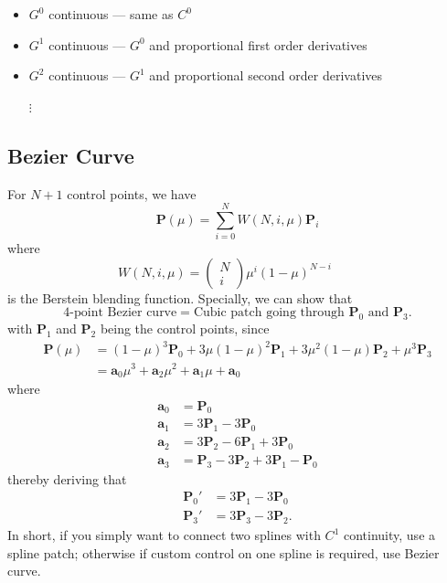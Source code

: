 \documentclass[twocolumn,landscape,10pt]{article}
\theoremstyle{definition}
\begin{document}
\begin{itemize}
    \item $G^0$ continuous --- same as $C^0$
    \item $G^1$ continuous --- $G^0$ and proportional first order derivatives
    \item $G^2$ continuous --- $G^1$ and proportional second order derivatives
    \item[$\vdots$]
\end{itemize} 

\subsection{Bezier Curve}

For $N+1$ control points, we have
\[
    \mathbf{P}(\mu)=\sum_{i=0}^{N} W(N,i,\mu)\mathbf{P}_i
\]
where
\[
    W(N,i,\mu)=
    \begin{pmatrix}
        N \\
        i
    \end{pmatrix} 
    \mu^i{(1-\mu)}^{N-i}\qquad
\]
is the Berstein blending function.
Specially, we can show that
\[
    \text{4-point Bezier curve}=
    \text{Cubic patch going through $\mathbf{P}_0$ and $\mathbf{P}_3$}.
\]
with $\mathbf{P}_1$ and $\mathbf{P}_2$ being the control points, since
\begin{align*}
    \mathbf{P}(\mu)
    &={(1-\mu)}^{3}\mathbf{P}_0+3\mu{(1-\mu)}^{2}\mathbf{P}_1
    +3\mu^2(1-\mu)\mathbf{P}_2+\mu^3\mathbf{P}_3 \\
    &=\mathbf{a}_0\mu^3+\mathbf{a}_2\mu^2+\mathbf{a}_1\mu+\mathbf{a}_0
\end{align*} 
where
\begin{align*}
    \mathbf{a}_0 & = \mathbf{P}_0 \\
    \mathbf{a}_1 & = 3\mathbf{P}_1 - 3\mathbf{P}_0 \\
    \mathbf{a}_2 & = 3\mathbf{P}_2 - 6\mathbf{P}_1 + 3\mathbf{P}_0 \\
    \mathbf{a}_3 & = \mathbf{P}_3 - 3\mathbf{P}_2 + 3\mathbf{P}_1-\mathbf{P}_0
\end{align*} 
thereby deriving that
\begin{align*}
    \mathbf{P}_0' & = 3\mathbf{P}_1-3\mathbf{P}_0 \\
    \mathbf{P}_3' & = 3\mathbf{P}_3-3\mathbf{P}_2.
\end{align*} 
In short, if you simply want to connect two splines with $C^1$ continuity,
use a spline patch; otherwise if custom control on one spline is required,
use Bezier curve.
\end{document}
